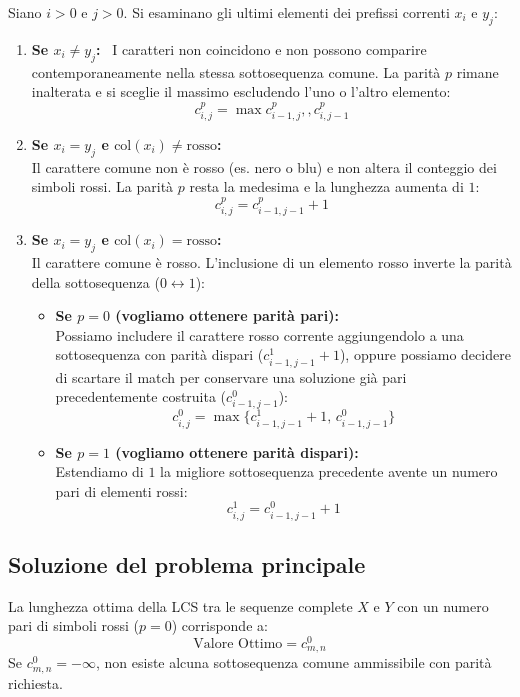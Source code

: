 Siano $i > 0$ e $j > 0$. Si esaminano gli ultimi elementi dei prefissi correnti $x_i$ e $y_j$:\begin{enumerate}
\item \textbf{Se $x_i \neq y_j$:} \
I caratteri non coincidono e non possono comparire contemporaneamente nella stessa sottosequenza comune. La parità $p$ rimane inalterata e si sceglie il massimo escludendo l'uno o l'altro elemento:
\begin{equation*}
c_{i,j}^p = \max { c_{i-1, j}^p, , c_{i, j-1}^p }
\end{equation*}\item \textbf{Se $x_i = y_j$ e $\text{col}(x_i) \neq \text{rosso}$:} \\
Il carattere comune non è rosso (es. nero o blu) e non altera il conteggio dei simboli rossi. La parità $p$ resta la medesima e la lunghezza aumenta di $1$:
\begin{equation*}
    c_{i,j}^p = c_{i-1, j-1}^p + 1
\end{equation*}

\item \textbf{Se $x_i = y_j$ e $\text{col}(x_i) = \text{rosso}$:} \\
Il carattere comune è rosso. L'inclusione di un elemento rosso inverte la parità della sottosequenza ($0 \leftrightarrow 1$):
\begin{itemize}
    \item \textbf{Se $p = 0$ (vogliamo ottenere parità pari):} \\
    Possiamo includere il carattere rosso corrente aggiungendolo a una sottosequenza con parità dispari ($c_{i-1, j-1}^1 + 1$), oppure possiamo decidere di scartare il match per conservare una soluzione già pari precedentemente costruita ($c_{i-1, j-1}^0$):
    \begin{equation*}
        c_{i,j}^0 = \max \{ c_{i-1, j-1}^1 + 1, \, c_{i-1, j-1}^0 \}
    \end{equation*}
    \item \textbf{Se $p = 1$ (vogliamo ottenere parità dispari):} \\
    Estendiamo di $1$ la migliore sottosequenza precedente avente un numero pari di elementi rossi:
    \begin{equation*}
        c_{i,j}^1 = c_{i-1, j-1}^0 + 1
    \end{equation*}
\end{itemize}
\end{enumerate}

\subsection{Soluzione del problema principale}
La lunghezza ottima della LCS tra le sequenze complete $X$ e $Y$ con un numero pari di simboli rossi ($p=0$) corrisponde a:
\begin{equation*}
\text{Valore Ottimo} = c_{m, n}^0
\end{equation*}
Se $c_{m, n}^0 = -\infty$, non esiste alcuna sottosequenza comune ammissibile con parità richiesta.
